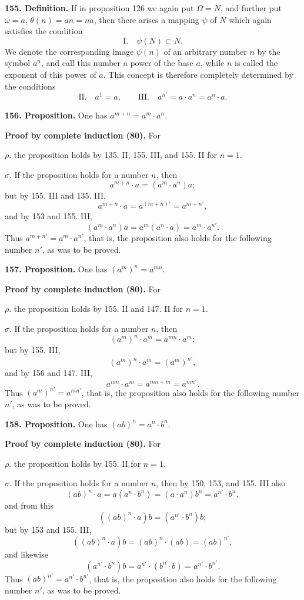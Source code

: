 \documentclass[11pt]{article}
\newcommand{\partof}{\mathrel{\subset}}
\begin{document}
\noindent\textbf{155. Definition.} If in proposition 126 we again put $\Omega=N$, and further put $\omega=a$, $\theta(n)=an=na$, then there arises a mapping $\psi$ of $N$ which again satisfies the condition
\[
\text{I.}\quad \psi(N)\partof N.
\]
We denote the corresponding image $\psi(n)$ of an arbitrary number $n$ by the symbol $a^n$, and call this number a power of the base $a$, while $n$ is called the exponent of this power of $a$. This concept is therefore completely determined by the conditions
\[
\text{II.}\quad a^1=a,
\qquad
\text{III.}\quad a^{n'}=a\cdot a^n=a^n\cdot a.
\]

\noindent\textbf{156. Proposition.} One has $a^{m+n}=a^m\cdot a^n$.

\noindent\textbf{Proof by complete induction (80).} For

\noindent $\rho.$ the proposition holds by 135. II, 155. III, and 155. II for $n=1$.

\noindent $\sigma.$ If the proposition holds for a number $n$, then
\[
a^{m+n}\cdot a=(a^m\cdot a^n)a;
\]
but by 155. III and 135. III,
\[
a^{m+n}\cdot a=a^{(m+n)'}=a^{m+n'},
\]
and by 153 and 155. III,
\[
(a^m\cdot a^n)a=a^m(a^n\cdot a)=a^m\cdot a^{n'}.
\]
Thus $a^{m+n'}=a^m\cdot a^{n'}$, that is, the proposition also holds for the following number $n'$, as was to be proved.

\noindent\textbf{157. Proposition.} One has $(a^m)^n=a^{mn}$.

\noindent\textbf{Proof by complete induction (80).} For

\noindent $\rho.$ the proposition holds by 155. II and 147. II for $n=1$.

\noindent $\sigma.$ If the proposition holds for a number $n$, then
\[
(a^m)^n\cdot a^m=a^{mn}\cdot a^m;
\]
but by 155. III,
\[
(a^m)^n\cdot a^m=(a^m)^{n'},
\]
and by 156 and 147. III,
\[
a^{mn}\cdot a^m=a^{mn+m}=a^{mn'}.
\]
Thus $(a^m)^{n'}=a^{mn'}$, that is, the proposition also holds for the following number $n'$, as was to be proved.

\noindent\textbf{158. Proposition.} One has $(ab)^n=a^n\cdot b^n$.

\noindent\textbf{Proof by complete induction (80).} For

\noindent $\rho.$ the proposition holds by 155. II for $n=1$.

\noindent $\sigma.$ If the proposition holds for a number $n$, then by 150, 153, and 155. III also
\[
(ab)^n\cdot a=a(a^n\cdot b^n)=(a\cdot a^n)b^n=a^{n'}\cdot b^n,
\]
and from this
\[
((ab)^n\cdot a)b=(a^{n'}\cdot b^n)b;
\]
but by 153 and 155. III,
\[
((ab)^n\cdot a)b=(ab)^n\cdot(ab)=(ab)^{n'},
\]
and likewise
\[
(a^{n'}\cdot b^n)b=a^{n'}\cdot(b^n\cdot b)=a^{n'}\cdot b^{n'}.
\]
Thus $(ab)^{n'}=a^{n'}\cdot b^{n'}$, that is, the proposition also holds for the following number $n'$, as was to be proved.
\end{document}
